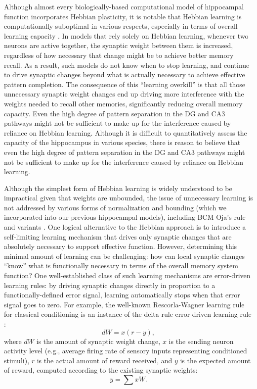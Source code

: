 \documentclass[11pt,twoside]{article}
\newif\myifpdf
\begin{document}
Although almost every biologically-based computational model of hippocampal function incorporates Hebbian plasticity, it is notable that Hebbian learning is computationally suboptimal in various respects, especially in terms of overall learning capacity \citep{Abu-MostafaSt.Jacques85,TrevesRolls91}.  In models that rely solely on Hebbian learning, whenever two neurons are active together, the synaptic weight between them is increased, regardless of how necessary that change might be to achieve better memory recall.  As a result, such models do not know when to stop learning, and continue to drive synaptic changes beyond what is actually necessary to achieve effective pattern completion.  The consequence of this ``learning overkill'' is that all those unnecessary synaptic weight changes end up driving more interference with the weights needed to recall other memories, significantly reducing overall memory capacity. Even the high degree of pattern separation in the DG and CA3 pathways might not be sufficient to make up for the interference caused by reliance on Hebbian learning. Although it is difficult to quantitatively assess the capacity of the hippocampus in various species, there is reason to believe that even the high degree of pattern separation in the DG and CA3 pathways might not be sufficient to make up for the interference caused by reliance on Hebbian learning.

Although the simplest form of Hebbian learning is widely understood to be impractical given that weights are unbounded, the issue of unnecessary learning is not addressed by various forms of normalization and bounding (which we incorporated into our previous hippocampal models), including BCM \citep{BienenstockCooperMunro82} Oja's rule and variants \citep{Oja89,OReillyMunakata00}.  One logical alternative to the Hebbian approach is to introduce a self-limiting learning mechanism that drives only synaptic changes that are absolutely necessary to support effective function.  However, determining this minimal amount of learning can be challenging: how can local synaptic changes ``know'' what is functionally necessary in terms of the overall memory system function?  One well-established class of such learning mechanisms are error-driven learning rules: by driving synaptic changes directly in proportion to a functionally-defined error signal, learning automatically stops when that error signal goes to zero. For example, the well-known Rescorla-Wagner learning rule for classical conditioning \citep{RescorlaWagner72} is an instance of the delta-rule error-driven learning rule \citep{WidrowHoff60}:
\begin{equation}
\label{eq.Rescorla-Wagner}
	dW = x (r - y),
\end{equation}
where $dW$ is the amount of synaptic weight change, $x$ is the sending neuron activity level (e.g., average firing rate of sensory inputs representing conditioned stimuli), $r$ is the actual amount of reward received, and $y$ is the expected amount of reward, computed according to the existing synaptic weights:
\begin{equation}
\label{eq.prepostsynaptic}
	y = \sum x W.
\end{equation}
\end{document}
